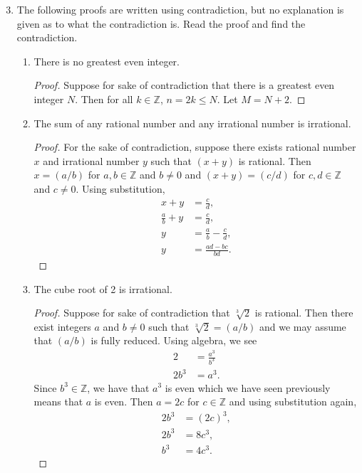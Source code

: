 \documentclass[12 pt]{article}
\newcommand{\Z}{\mathbb{Z}}
\theoremstyle{definition}
\theoremstyle{plain}
\theoremstyle{mytheorem}
\theoremstyle{myexample}
\theoremstyle{mydefinition}
\begin{document}
\begin{enumerate}
\setcounter{enumi}{2}
\item The following proofs are written using contradiction, but no explanation is given as to what the contradiction is.  Read the proof and find the contradiction.
	\begin{enumerate} \itemsep.75in
	\item There is no greatest even integer.
		\begin{proof}  Suppose for sake of contradiction that there is a greatest even integer $N$.  Then for all $k \in \Z$, $n=2k \leq N$.  Let $M = N+2$.
		\end{proof}
	\item The sum of any rational number and any irrational number is irrational.
		\begin{proof}  For the sake of contradiction, suppose there exists rational number $x$ and irrational number $y$ such that $(x+y)$ is rational.  Then $x =(a/b)$ for $a,b \in \Z$ and $b \neq 0$ and $(x+y) = (c/d)$ for $c,d \in \Z$ and $c \neq 0$.  Using substitution, 
			\begin{align*}
			x+y &= \frac{c}{d},\\
			\frac{a}{b} +y &= \frac{c}{d},\\
			y &= \frac{a}{b}-\frac{c}{d}, \\
			y &= \frac{ad-bc}{bd}.
			\end{align*}
		\end{proof}
	\item The cube root of 2 is irrational.
	\begin{proof} Suppose for sake of contradiction that $\sqrt[3]{2}$ is rational.  Then there exist integers $a$ and $b \neq 0$ such that $\sqrt[3]{2} = (a/b)$ and we may assume that $(a/b)$ is fully reduced.  Using algebra, we see
	\begin{align*}
	2 &= \frac{a^3}{b^3} \\
	2b^3 &= a^3.
	\end{align*}
	Since $b^3 \in \Z$, we have that $a^3$ is even which we have seen previously means that $a$ is even.  Then $a = 2c$ for $c \in \Z$ and using substitution again,
	\begin{align*}
	2b^3 &= (2c)^3, \\
	2b^3 &= 8c^3, \\
	b^3 &= 4c^3.
	\end{align*}
	\end{proof}
	\vspace{.75in}
	\end{enumerate}



\end{enumerate}
\end{document}
